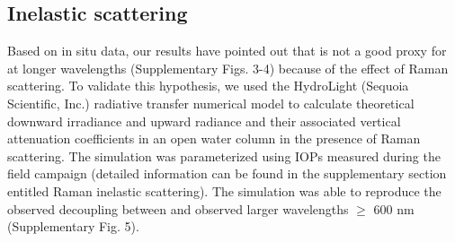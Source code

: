 \subsection{Inelastic scattering}

Based on in situ data, our results have pointed out that \klu{} is not a good proxy for \ked{} at longer wavelengths (Supplementary Figs. 3-4) because of the effect of Raman scattering. To validate this hypothesis, we used the HydroLight (Sequoia Scientific, Inc.) radiative transfer numerical model to calculate theoretical downward irradiance and upward radiance and their associated vertical attenuation coefficients in an open water column in the presence of Raman scattering. The simulation was parameterized using IOPs measured during the field campaign (detailed information can be found in the supplementary section entitled Raman inelastic scattering). The simulation was able to reproduce the observed decoupling between \ked{} and \klu{} observed larger wavelengths $\ge$ 600 nm (Supplementary Fig. 5).